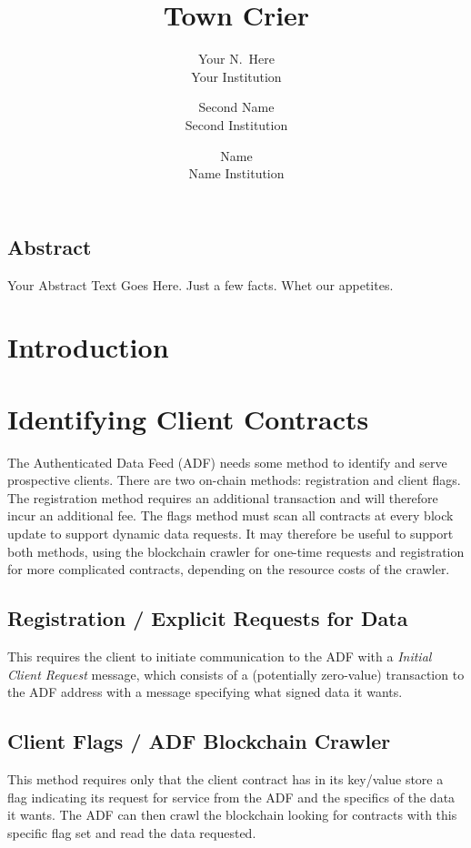 \documentclass[letterpaper,twocolumn,10pt]{article}
\date{}
\title{\Large \bf Town Crier}
\author{
{\rm Your N.\ Here}\\
Your Institution
\and
{\rm Second Name}\\
Second Institution
\and
{\rm Name}\\
Name Institution
} %
\begin{document}
\maketitle


\subsection*{Abstract}
Your Abstract Text Goes Here.  Just a few facts.
Whet our appetites.

\section{Introduction}

\section{Identifying Client Contracts}
The Authenticated Data Feed (ADF) needs some method to identify and serve prospective clients.  There are two on-chain methods: registration and client flags.  The registration method requires an additional transaction and will therefore incur an additional fee.  The flags method must scan all contracts at every block update to support dynamic data requests.  It may therefore be useful to support both methods, using the blockchain crawler for one-time requests and registration for more complicated contracts, depending on the resource costs of the crawler.
\subsection{Registration / Explicit Requests for Data}
	This requires the client to initiate communication to the ADF with a \emph{Initial Client Request} message, which consists of a (potentially zero-value) transaction to the ADF address with a message specifying what signed data it wants. 
	
\subsection{Client Flags / ADF Blockchain Crawler}
	This method requires only that the client contract has in its key/value store a flag indicating its request for service from the ADF and the specifics of the data it wants.  The ADF can then crawl the blockchain looking for contracts with this specific flag set and read the data requested.
	
\end{document}
